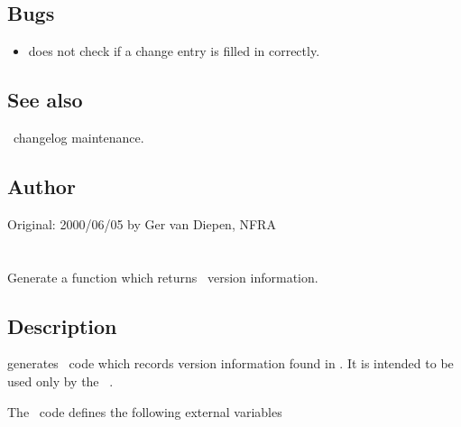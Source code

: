 \subsection*{Bugs}

\begin{itemize}
\item
    does not check if a change entry is filled in
   correctly. 
\end{itemize}

\subsection*{See also}

 \aipspp\ changelog maintenance.

\subsection*{Author}

Original: 2000/06/05 by Ger van Diepen, NFRA


\newpage
\section{}
\label{doover}
 
Generate a function which returns \aipspp\ version information.

\begin{synopsis}
\end{synopsis}
 
\subsection*{Description}
 
 generates \cplusplus\ code which records version information
found in .  It is intended to be used only by the
\aipspp\ .

The \cplusplus\ code defines the following external variables

